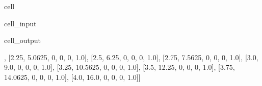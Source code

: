 \documentclass[letterpaper,10pt,english]{jupyterBook}
\begin{document}
\begin{sphinxuseclass}{cell}\begin{sphinxVerbatimInput}

\begin{sphinxuseclass}{cell_input}
\begin{sphinxVerbatim}[commandchars=\\\{\}]
  \PYG{p}{[}        \PYG{p}{]}
  \PYG{p}{[}\PYG{p}{]}

   
  \PYG{p}{[}   \PYG{p}{]}

\end{sphinxVerbatim}

\end{sphinxuseclass}\end{sphinxVerbatimInput}
\begin{sphinxVerbatimOutput}

\begin{sphinxuseclass}{cell_output}
\begin{sphinxVerbatim}[commandchars=\\\{\}]
[[2.0, 4.0, 0, 0, 0, 1.0],
 [2.25, 5.0625, 0, 0, 0, 1.0],
 [2.5, 6.25, 0, 0, 0, 1.0],
 [2.75, 7.5625, 0, 0, 0, 1.0],
 [3.0, 9.0, 0, 0, 0, 1.0],
 [3.25, 10.5625, 0, 0, 0, 1.0],
 [3.5, 12.25, 0, 0, 0, 1.0],
 [3.75, 14.0625, 0, 0, 0, 1.0],
 [4.0, 16.0, 0, 0, 0, 1.0]]
\end{sphinxVerbatim}

\end{sphinxuseclass}\end{sphinxVerbatimOutput}

\end{sphinxuseclass}
\end{document}
